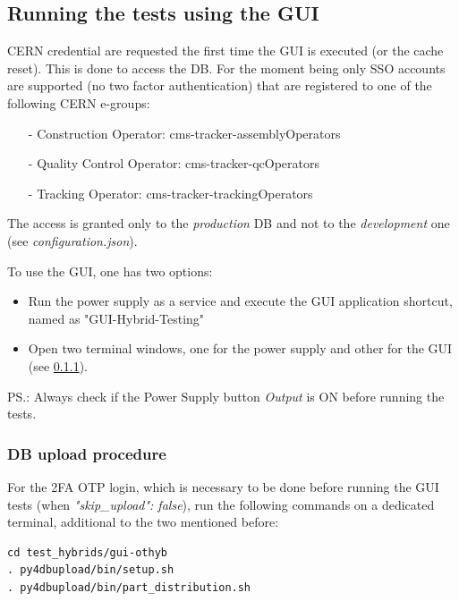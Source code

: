 \documentclass[10pt,a4paper]{article}
\begin{document}
\subsection{Running the tests using the GUI}

CERN credential are requested the first time the GUI is executed (or the cache reset). This is done to access the DB. For the moment being only SSO accounts are supported (no two factor authentication) that are registered to one of the following CERN e-groups:
\begin{itemize}
\item[-] Construction Operator: cms-tracker-assemblyOperators
\item[-] Quality Control Operator: cms-tracker-qcOperators
\item[-] Tracking Operator: cms-tracker-trackingOperators
\end{itemize}
The access is granted only to the {\it production} DB and not to the {\it development} one (see \emph{configuration.json}). 

To use the GUI, one has two options:

\begin{itemize}
    \item Run the power supply as a service and execute the GUI application shortcut, named as "GUI-Hybrid-Testing"
    \item Open two terminal windows, one for the power supply and other for the GUI (see \ref{DBup}).
\end{itemize}

PS.: Always check if the Power Supply button \textit{Output} is ON before running the tests. 

\subsubsection{DB upload procedure}
\label{DBup}

For the 2FA OTP login, which is necessary to be done before running the GUI tests (when \emph{"skip\_upload": false}), run the following commands on a dedicated terminal, additional to the two mentioned before:

\begin{framed}
\begin{verbatim}
cd test_hybrids/gui-othyb
. py4dbupload/bin/setup.sh
. py4dbupload/bin/part_distribution.sh
\end{verbatim}
\end{framed}
\end{document}

